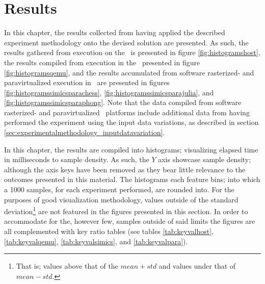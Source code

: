 
\chapter{Results}
\label{cha:results}
In this chapter, the results collected from having applied the described experiment methodology onto the devised solution are presented.
As such, the results gathered from execution on the \dvttermhost\ is presented in figure \ref{fig:histogramshost}, the results compiled from execution in the \dvttermandroidemulator\ presented in figure \ref{fig:histogramsqemu}, and the results accumulated from software rasterized- and paravirtualized execution in \dvttermsimics\ are presented in figures \ref{fig:histogramssimicsparachess}, \ref{fig:histogramssimicsparajulia}, and \ref{fig:histogramssimicsparaphong}.
Note that the data compiled from software rasterized- and paravirtualized \dvttermsimics\ platforms include additional data from having performed the experiment using the input data variations, as described in section \ref{sec:experimentalmethodology_inputdatavariation}.

In this chapter, the results are compiled into histograms; visualizing elapsed time in milliseconds to sample density.
As such, the $Y$ axis showcase sample density; although the axis keys have been removed as they bear little relevance to the outcomes presented in this material.
The histograms each feature  bins; into which a 1000 samples, for each experiment performed, are rounded into.
For the purposes of good visualization methodology, values outside of the standard deviation\footnote{That is; values above that of the $mean + std$ and values under that of $mean - std$.} are not featured in the figures presented in this section.
In order to accommodate for the, however few, samples outside of said limits the figures are all complemented with key ratio tables (see tables \ref{tab:keyvalhost}, \ref{tab:keyvalqemu}, \ref{tab:keyvalsimics}, and \ref{tab:keyvalpara}).


